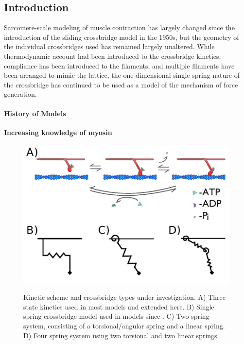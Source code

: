\documentclass[11pt]{article}
\begin{document}
\begin{multicols}{2}



\section*{Introduction}

Sarcomere-scale modeling of muscle contraction has largely changed since the introduction of the sliding crossbridge model in the 1950s, but the geometry of the individual crossbridges used has remained largely unaltered. While thermodynamic account had been introduced to the crossbridge kinetics, compliance has been introduced to the filaments, and multiple filaments have been arranged to mimic the lattice, the one dimensional single spring nature of the crossbridge has continued to be used as a model of the mechanism of force generation.

\paragraph*{History of Models}

\paragraph*{Increasing knowledge of myosin}

\begin{figure}[H]
\begin{center}
\includegraphics{../imgs/XBCycle.pdf}
\label{xbtypes}
\caption{{\small Kinetic scheme and crossbridge types under investigation. A) Three state kinetics used in most models and extended here. B) Single spring crossbridge model used in models since \cite{Huxley57}. C) Two spring system, consisting of a torsional/angular spring and a linear spring. D) Four spring system using two torsional and two linear springs.}}
\end{center}
\end{figure}



\end{multicols}
\end{document}
